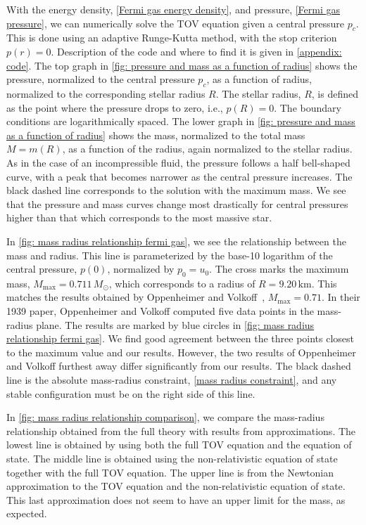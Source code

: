 With the energy density, \autoref{Fermi gas energy density}, and pressure, \autoref{Fermi gas pressure}, we can numerically solve the TOV equation given a central pressure $p_c$. 
This is done using an adaptive Runge-Kutta method, with the stop criterion $p(r) = 0$.
Description of the code and where to find it is given in \autoref{appendix: code}.
The top graph in \autoref{fig: pressure and mass as a function of radius} shows the pressure, normalized to the central pressure $p_c$, as a function of radius, normalized to the corresponding stellar radius $R$.
The stellar radius, $R$, is defined as the point where the pressure drops to zero, i.e., $p(R) = 0$.
The boundary conditions are logarithmically spaced.
The lower graph in \autoref{fig: pressure and mass as a function of radius} shows the mass, normalized to the total mass $M = m(R)$, as a function of the radius, again normalized to the stellar radius.
As in the case of an incompressible fluid, the pressure follows a half bell-shaped curve, with a peak that becomes narrower as the central pressure increases.
The black dashed line corresponds to the solution with the maximum mass.
We see that the pressure and mass curves change most drastically for central pressures higher than that which corresponds to the most massive star.



In \autoref{fig: mass radius relationship fermi gas}, we see the relationship between the mass and radius.
This line is parameterized by the base-10 logarithm of the central pressure, $p(0)$, normalized by $p_0 = u_0$.
The cross marks the maximum mass, $M_\mathrm{max} = 0.711 \, M_\odot$, which corresponds to a radius of $R = 9.20 \, \mathrm{km}$.
This matches the results obtained by Oppenheimer and Volkoff~\cite{oppenheimerMassiveNeutronCores1939}, $M_\mathrm{max} = 0.71$.
In their 1939 paper, Oppenheimer and Volkoff computed five data points in the mass-radius plane.
The results are marked by blue circles in \autoref{fig: mass radius relationship fermi gas}.
We find good agreement between the three points closest to the maximum value and our results.
However, the two results of Oppenheimer and Volkoff furthest away differ significantly from our results.
The black dashed line is the absolute mass-radius constraint, \autoref{mass radius constraint}, and any stable configuration must be on the right side of this line.


In \autoref{fig: mass radius relationship comparison}, we compare the mass-radius relationship obtained from the full theory with results from approximations.
The lowest line is obtained by using both the full TOV equation and the equation of state.
The middle line is obtained using the non-relativistic equation of state together with the full TOV equation.
The upper line is from the Newtonian approximation to the TOV equation and the non-relativistic equation of state.
This last approximation does not seem to have an upper limit for the mass, as expected.


